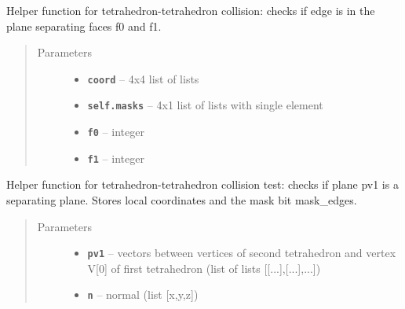 \documentclass[letterpaper,10pt,english]{sphinxmanual}
\begin{document}
\begin{fulllineitems}
\begin{fulllineitems}
\label{pk_src.collision_tet_tet:pk_src.collision_tet_tet.Collision_tet_tet.separating_plane_edge_A}
Helper function for tetrahedron-tetrahedron collision: checks if edge is in the plane separating faces f0 and f1.
\begin{quote}\begin{description}
\item[{Parameters}] \leavevmode\begin{itemize}
\item {} 
\textbf{\texttt{coord}} -- 4x4 list of lists

\item {} 
\textbf{\texttt{self.masks}} -- 4x1 list of lists with single element

\item {} 
\textbf{\texttt{f0}} -- integer

\item {} 
\textbf{\texttt{f1}} -- integer

\end{itemize}

\end{description}\end{quote}

\end{fulllineitems}


\begin{fulllineitems}
\label{pk_src.collision_tet_tet:pk_src.collision_tet_tet.Collision_tet_tet.separating_plane_faceA_1}
Helper function for tetrahedron-tetrahedron collision test:
checks if plane pv1 is a separating plane. Stores local coordinates and the mask bit mask\_edges.
\begin{quote}\begin{description}
\item[{Parameters}] \leavevmode\begin{itemize}
\item {} 
\textbf{\texttt{pv1}} -- vectors between vertices of second tetrahedron and vertex V{[}0{]} of first tetrahedron (list of lists {[}{[}...{]},{[}...{]},...{]})

\item {} 
\textbf{\texttt{n}} -- normal (list {[}x,y,z{]})


\end{itemize}
\end{description}
\end{quote}
\end{fulllineitems}
\end{fulllineitems}
\end{document}
